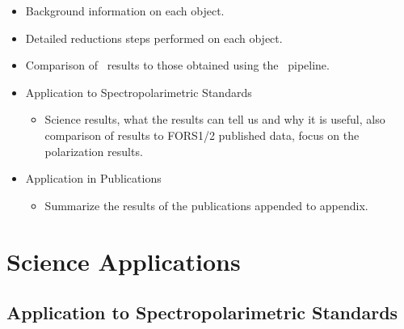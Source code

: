 \begin{itemize}
    \item Background information on each object.
    \item Detailed reductions steps performed on each object.
    \item Comparison of \polsalt\ results to those obtained using the \stops\ pipeline.
\end{itemize}

\begin{itemize}
    \item Application to Spectropolarimetric Standards
    \begin{itemize}
        \item Science results, what the results can tell us and why it is useful, also comparison of results to FORS1/2 published data, focus on the polarization results.
    \end{itemize}
    
    \item Application in Publications
    \begin{itemize}
        \item Summarize the results of the publications appended to appendix.
    \end{itemize}
\end{itemize}

\chapter{Science Applications}


\section{Application to Spectropolarimetric Standards}

